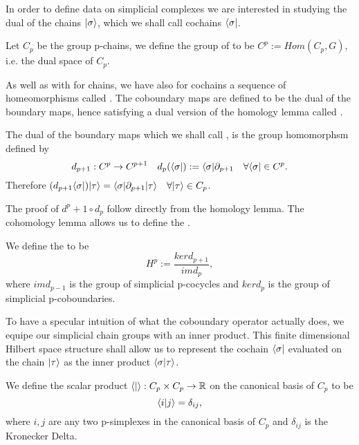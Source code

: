 \documentclass[../1.tex]{subfiles}
\begin{document}
    In order to define data on simplicial complexes we are interested in studying the dual of the chains $| \sigma \rangle$,
    which we shall call cochains $\langle \sigma |$.
       
    \begin{defn}
        Let $C_p$ be the group p-chains, we define the group of  to 
        be $C^p := Hom(C_p, G)$, i.e. the dual space of $C_p$.
    \end{defn}

    As well as with for chains, we have also for cochains a sequence of homeomorphisms called . The coboundary maps are defined
    to be the dual of the boundary maps, hence satisfying a dual version of the homology lemma called .

    \begin{defn}
        The dual of the boundary maps which we shall call
        , is the group homomorphsm defined by
        \[ d_{p+1} : C^p \to C^{p+1} \quad d_p(\langle \sigma |) := \langle \sigma | \partial_{p+1} \quad \forall \langle \sigma | \in C^p.\]
        Therefore $(d_{p+1}\langle \sigma |)| \tau \rangle = \langle \sigma | \partial_{p+1} | \tau \rangle \quad \forall | \tau \rangle \in C_p$.
    \end{defn}

    The proof of $d^p+1 \circ d_p$ follow directly from the homology lemma. The cohomology lemma allows us to define the .
    
    \begin{defn}
        We define the  to be 
        \[H^p := \frac{ker d_{p+1}}{im d_{p}},\] 
        where $im d_{p-1}$ is the group of simplicial p-cocycles and
        $ker d_p$ is the group of simplicial p-coboundaries.
    \end{defn}

    To have a specular intuition of what the coboundary operator actually does, we equipe our simplicial chain groups with
    an inner product. This finite dimensional Hilbert space structure shall allow us to represent the cochain $\langle \sigma |$ evaluated on the chain $| \tau \rangle$ 
    as the inner product $\langle \sigma | \tau \rangle$.

    \begin{defn}
        We define the scalar product $\langle  |  \rangle : C_p \times C_p \to \mathbb{R}$ on the canonical basis of $C_p$ to be 
        \[ \langle i | j \rangle = \delta_{ij} ,\]  
        where $i,j$ are any two p-simplexes in the canonical basis of $C_p$ and $\delta_{ij}$ is the Kronecker Delta.
    \end{defn}
\end{document}

